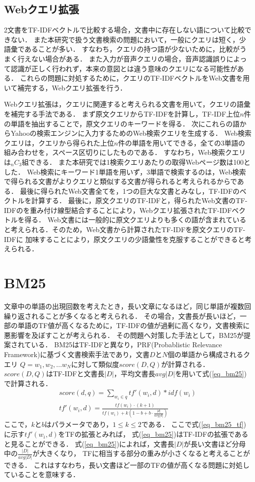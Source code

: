 \subsection{Webクエリ拡張}   \label{sec_webquery}
2文書をTF-IDFベクトルで比較する場合，文書中に存在しない語について比較できない．
また本研究で扱う文書検索の問題において，一般にクエリは短く，少語彙であることが多い．
すなわち，クエリの持つ語が少ないために，比較がうまく行えない場合がある．
また入力が音声クエリの場合，音声認識誤りによって認識が正しく行われず，本来の意図とは違う意味のクエリになる可能性がある．
これらの問題に対処するために，クエリのTF-IDFベクトルをWeb文書を用いて補完する，Webクエリ拡張を行う．

Webクエリ拡張は，クエリに関連すると考えられる文書を用いて，クエリの語彙を補完する手法である．
まず原文クエリからTF-IDFを計算し，TF-IDF上位$n$件の単語を抽出することで，原文クエリのキーワードを得る．
次にこれらの語からYahooの検索エンジンに入力するためのWeb検索クエリを生成する．
Web検索クエリは，クエリから得られた上位$n$件の単語を用いてできる，全ての3単語の組み合わせを，スペース区切りにしたものである．
すなわち，Web検索クエリは$_n C _3$組できる．
また本研究では1検索クエリあたりの取得Webページ数は100とした．
Web検索にキーワード1単語を用いず，3単語で検索するのは，Web検索で得られる文書がよりクエリと類似する文書が得られると考えられるからである．
最後に得られたWeb文書全てを，1つの巨大な文書とみなし，TF-IDFのベクトルを計算する．
最後に，原文クエリのTF-IDFと，得られたWeb文書のTF-IDFのを重み付け線型結合することにより，Webクエリ拡張されたTF-IDFベクトルを得る．
Web文書には一般的に原文クエリよりも多くの語が含まれていると考えられる．そのため，Web文書から計算されたTF-IDFを原文クエリのTF-IDFに
加味することにより，原文クエリの少語彙性を克服することができると考えられる．

\section{BM25}
文章中の単語の出現回数を考えたとき，長い文章になるほど，同じ単語が複数回繰り返されることが多くなると考えられる．
その場合，文書長が長いほど，一部の単語のTF値が高くなるために，TF-IDFの値が過剰に高くなり，文書検索に悪影響を及ぼすことが考えられる．
その問題へ対策した手法として，BM25\cite{BM25}が提案されている．
BM25はTF-IDFと異なり，PRF(Probablistic Relevance Framework)に基づく文書検索手法であり，文書$D$と$N$個の単語から構成されるクエリ
$Q = {w_1, w_2, ...w_N}$に対して類似度$score(D, Q)$が計算される．
$score(D, Q)$はTF-IDFと文書長$|D|$，平均文書長$avg|D|$を用いて式(\ref{eq_bm25})で計算される．
\begin{eqnarray}
    score(d, q) = \sum_{w_i \in q} tf'(w_i, d) * idf(w_i) \label{eq_bm25}  \\
    tf'(w_i, d) = \frac{ tf(w_i) \cdot (k+1) }{ tf(w_i) + k(1-b + b \cdot \frac{ |d| }{ avg|d| })} \label{eq_bm25_tf}
\end{eqnarray}
ここで，$k$と$b$はパラメータであり，$1 \leq k \leq 2$である．
ここで式(\ref{eq_bm25_tf})に示す$tf'(w_i, d)$をTFの拡張とみれば，
式(\ref{eq_bm25})はTF-IDFの拡張であると見ることができる．
式(\ref{eq_bm25})によれば，文書長$|D|$が長い文書ほど分母中の$\frac{ |D| }{ avg|D| }$が大きくなり，
TFに相当する部分の重みが小さくなると考えることができる．
これはすなわち，長い文書ほど一部のTFの値が高くなる問題に対処していることを意味する． 
